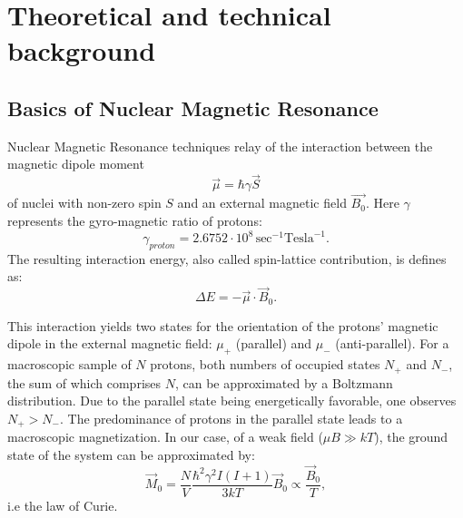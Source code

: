 \section{Theoretical and technical background}
\subsection{Basics of Nuclear Magnetic Resonance}

Nuclear Magnetic Resonance techniques relay of the interaction between the magnetic dipole moment
\begin{equation}
\label{magnetic dipole moment}
\vec{\mu} = \hbar\gamma\vec{S} 
\end{equation}
 of nuclei with non-zero spin $S$ and an external magnetic field $\vec{B_0}$. Here $\gamma$ represents the gyro-magnetic ratio of protons:
$$ \gamma_{proton} = 2.6752 \cdot 10^8 \, \textrm{sec}^{-1}\textrm{Tesla}^{-1}.
$$The resulting interaction energy, also called spin-lattice contribution, is defines as:
\begin{equation}
\label{interaction energy}
\Delta E = -\vec{\mu}\cdot\vec{B}_0.
\end{equation}

This interaction yields two states for the orientation of the protons' magnetic dipole in the external magnetic field: $\mu_+$ (parallel) and $\mu_-$ (anti-parallel).
For a macroscopic sample of $N$ protons, both numbers of occupied states $N_+$ and $N_-$, the sum of which comprises $N$, can be approximated by a Boltzmann distribution.
Due to the parallel state being energetically favorable, one observes $N_+>N_-$. The predominance of protons in the parallel state leads to a macroscopic magnetization.
In our case, of a weak field ($\mu B \gg kT$), the ground state of the system can be approximated by:
\begin{equation}
\label{ground state approx}
\vec{M}_0 = \frac{N}{V} \frac{\hbar^2 \gamma^2 I(I+1)}{3kT}\vec{B}_0 \propto \frac{\vec{B}_0}{T},
\end{equation}
i.e the law of Curie.

